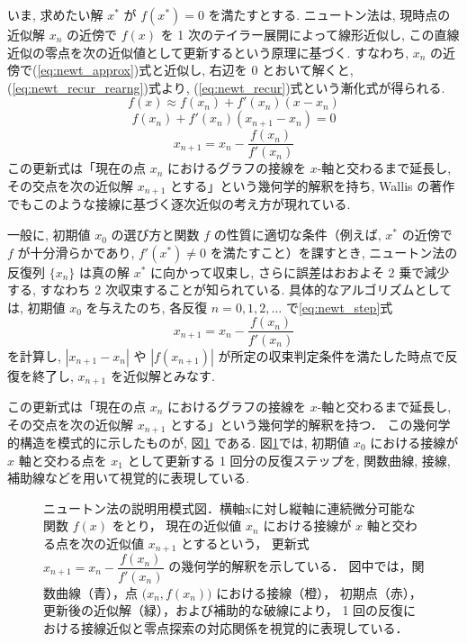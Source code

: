 \documentclass[a4paper,fontsize=11pt,line_length=40zw,number_of_lines=35,baselineskip=1.7zw]{jlreq}
\begin{document}
いま, 求めたい解 $x^*$ が $f(x^*)=0$ を満たすとする. ニュートン法は, 
現時点の近似解 $x_n$ の近傍で $f(x)$ を 1 次のテイラー展開によって線形近似し, 
この直線近似の零点を次の近似値として更新するという原理に基づく. 
すなわち, $x_n$ の近傍で(\ref{eq:newt_approx})式と近似し, 右辺を 0 とおいて解くと, (\ref{eq:newt_recur_rearng})式より, (\ref{eq:newt_recur})式という漸化式が得られる. 
\begin{equation}
  \label{eq:newt_approx}
  f(x) \approx f(x_n) + f'(x_n)(x-x_n)
\end{equation}
\begin{equation}
  \label{eq:newt_recur_rearng}
  f(x_n) + f'(x_n)(x_{n+1}-x_n) = 0
\end{equation}
\begin{equation}
  \label{eq:newt_recur}
  x_{n+1} = x_n - \frac{f(x_n)}{f'(x_n)}
\end{equation}
この更新式は「現在の点 $x_n$ におけるグラフの接線を $x$-軸と交わるまで延長し, 
その交点を次の近似解 $x_{n+1}$ とする」という幾何学的解釈を持ち, 
Wallis の著作でもこのような接線に基づく逐次近似の考え方が現れている.\cite{wallisTreatiseAlgebra1685}

一般に, 初期値 $x_0$ の選び方と関数 $f$ の性質に適切な条件（例えば, 
$x^*$ の近傍で $f$ が十分滑らかであり, $f'(x^*)\neq 0$ を満たすこと）を課すとき, 
ニュートン法の反復列 $\{x_n\}$ は真の解 $x^*$ に向かって収束し, 
さらに誤差はおおよそ 2 乗で減少する, すなわち 2 次収束することが知られている. 
具体的なアルゴリズムとしては, 初期値 $x_0$ を与えたのち, 
各反復 $n=0,1,2,\dots$ で\ref{eq:newt_step}式
  \begin{equation}
    \label{eq:newt_step}
    x_{n+1}=x_n-\frac{f(x_n)}{f'(x_n)}
  \end{equation}
を計算し, $|x_{n+1}-x_n|$ や $|f(x_{n+1})|$ が所定の収束判定条件を満たした時点で反復を終了し, $x_{n+1}$ を近似解とみなす. \cite{三井田2014数値計算法}

この更新式は「現在の点 $x_n$ におけるグラフの接線を $x$-軸と交わるまで延長し,
その交点を次の近似解 $x_{n+1}$ とする」という幾何学的解釈を持つ．
この幾何学的構造を模式的に示したものが, 図\ref{fig:newton_diagram} である.
図\ref{fig:newton_diagram}では, 初期値 $x_0$ における接線が $x$ 軸と交わる点を $x_1$ として更新する 1 回分の反復ステップを,
関数曲線, 接線, 補助線などを用いて視覚的に表現している.

\begin{figure}[htbp]
  \centering
  \caption{%
    ニュートン法の説明用模式図．横軸xに対し縦軸に連続微分可能な関数 $f(x)$ をとり，
    現在の近似値 $x_n$ における接線が $x$ 軸と交わる点を次の近似値 $x_{n+1}$ とするという，
    更新式 \(x_{n+1} = x_n - \dfrac{f(x_n)}{f'(x_n)}\) の幾何学的解釈を示している．
    図中では，関数曲線（青），点 $\bigl(x_n,f(x_n)\bigr)$ における接線（橙），
    初期点（赤），更新後の近似解（緑），および補助的な破線により，
    1 回の反復における接線近似と零点探索の対応関係を視覚的に表現している．
  }
  \label{fig:newton_diagram}
\end{figure}
\end{document}
